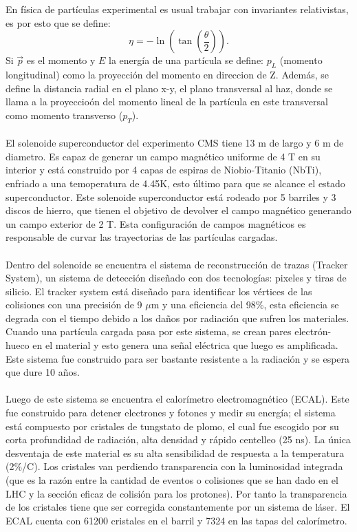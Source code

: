 En física de partículas experimental es usual trabajar con invariantes relativistas, es por esto que se define:
\begin{equation}
	\eta=-\ln\left(\tan\left(\frac{\theta}{2}\right) \right).
\end{equation} 	
Si $\vec{p}$ es el momento y $E$ la energía de una partícula se define: $p_L$ (momento longitudinal) como la proyección del momento en direccion de Z. Además, se define la distancia radial en el plano x-y, el plano transversal al haz, donde se llama a la proyeccioón del momento lineal de la partícula en este transversal como momento transverso ($p_T$).  
\\
\\
El solenoide superconductor del experimento CMS tiene 13 m de largo y 6 m de diametro. Es capaz de generar un campo magnético uniforme de 4 T en su interior y está construido por 4 capas de espiras de Niobio-Titanio (NbTi), enfriado a una temoperatura de 4.45K, esto último para que se alcance el estado superconductor. Este solenoide superconductor está rodeado por 5 barriles y 3 discos de hierro, que tienen el objetivo de devolver el campo magnético generando un campo exterior de 2 T.  Esta configuración de campos magnéticos es responsable de curvar las trayectorias de las partículas cargadas.
\\
\\
Dentro del solenoide se encuentra el sistema de reconstrucción de trazas (Tracker System), un sistema de detección diseñado con dos tecnologías: pixeles y tiras de silicio. El tracker system está diseñado para identificar los vértices de las colisiones con una precisión de 9 $\mu$m y una eficiencia del 98\%, esta eficiencia se degrada con el tiempo debido a los daños por radiación que sufren los materiales. Cuando una partícula cargada pasa por este sistema, se crean pares electrón-hueco en el material y esto genera una señal eléctrica que luego es amplificada. Este sistema fue construido para ser bastante resistente a la radiación y se espera que dure 10 años.
\\
\\
Luego de este sistema se encuentra el calorímetro electromagnético (ECAL). Este fue construido para detener electrones y fotones y medir su energía; el sistema está compuesto por cristales de tungstato de plomo, el cual fue escogido por su corta profundidad de radiación, alta densidad y rápido centelleo (25 ns). La única desventaja de este material es su alta sensibilidad de respuesta a la temperatura (2\%/C). Los cristales van perdiendo transparencia con la luminosidad integrada (que es la razón entre la cantidad de eventos o colisiones que se han dado en el LHC y la sección eficaz de colisión para los protones\cite{RuizAlvarez:2016mhn}). Por tanto la transparencia de los cristales tiene que ser corregida constantemente por un sistema de láser. El ECAL cuenta con 61200 cristales en el barril y 7324 en las tapas del calorímetro.
